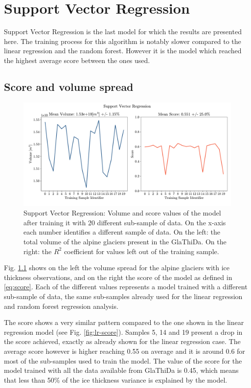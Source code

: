 \section{Support Vector Regression}\label{svr}
Support Vector Regression is the last model for which the results are presented here. The training process for this algorithm is notably slower compared to the linear regression and the random forest. However it is the model which reached the highest average score between the ones used. 

\subsection{Score and volume spread}\label{svr-score}

\begin{figure}[!tp]
	\centering		  
	\includegraphics[width=1.\textwidth]{figures/SVR_score.pdf}
	\caption{Support Vector Regression: Volume and score values of the model after training it with 20 different sub-sample of data. On the x-axis each number identifies a different sample of data. On the left: the total volume of the alpine glaciers present in the GlaThiDa. On the right: the $R^2$ coefficient for values left out of the training sample.}
	\label{fig:svr-score}
\end{figure}

Fig. \ref{svr-score} shows on the left the volume spread for the alpine glaciers with ice thickness observations, and on the right the score of the model as defined in \ref{eq:score}. Each of the different values represents a model trained with a different sub-sample of data, the same sub-samples already used for the linear regression and random forest regression analysis.

The score shows a very similar pattern compared to the one shown in the linear regression model (see Fig. \ref{fig:lr-score}). Samples 5, 14 and 19 present a drop in the score achieved, exactly as already shown for the linear regression case. The average score however is higher reaching 0.55 on average and it is around 0.6 for most of the sub-samples used to train the model.
The value of the score for the model trained with all the data available from GlaThiDa is 0.45, which means that less than 50\% of the ice thickness variance is explained by the model. 

